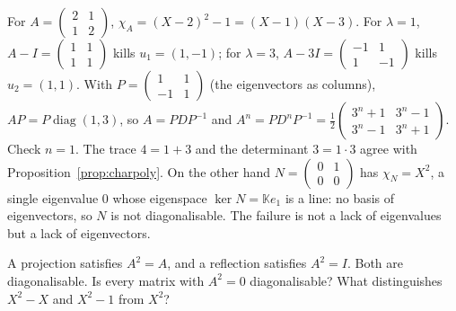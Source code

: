 \begin{examplex}
For $A=\begin{pmatrix}2&1\\1&2\end{pmatrix}$, $\chi_A=(X-2)^2-1=(X-1)(X-3)$. For $\lambda=1$, $A-I=\begin{pmatrix}1&1\\1&1\end{pmatrix}$ kills $u_1=(1,-1)$; for $\lambda=3$, $A-3I=\begin{pmatrix}-1&1\\1&-1\end{pmatrix}$ kills $u_2=(1,1)$. With $P=\begin{pmatrix}1&1\\-1&1\end{pmatrix}$ (the eigenvectors as columns), $AP=P\operatorname{diag}(1,3)$, so $A=PDP^{-1}$ and $A^n=PD^nP^{-1}=\frac12\begin{pmatrix}3^n+1&3^n-1\\3^n-1&3^n+1\end{pmatrix}$. Check $n=1$. The trace $4=1+3$ and the determinant $3=1\cdot3$ agree with Proposition~\ref{prop:charpoly}. On the other hand $N=\begin{pmatrix}0&1\\0&0\end{pmatrix}$ has $\chi_N=X^2$, a single eigenvalue $0$ whose eigenspace $\ker N=\mathbb Ke_1$ is a line: no basis of eigenvectors, so $N$ is not diagonalisable. The failure is not a lack of eigenvalues but a lack of eigenvectors.
\end{examplex}

\begin{think}
A projection satisfies $A^2=A$, and a reflection satisfies $A^2=I$. Both are diagonalisable. Is every matrix with $A^2=0$ diagonalisable? What distinguishes $X^2-X$ and $X^2-1$ from $X^2$?
\end{think}

